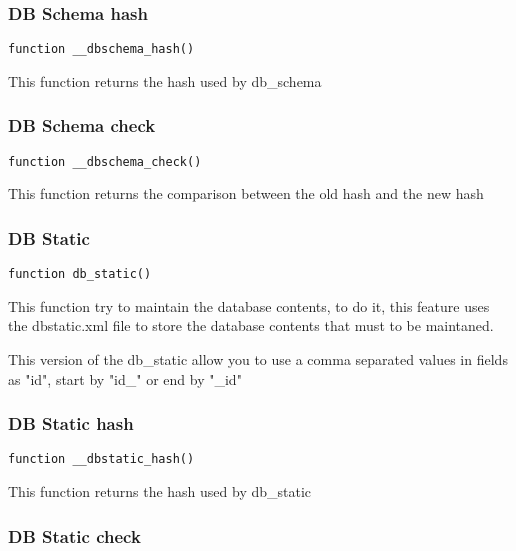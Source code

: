 \documentclass[a4paper]{article}
\begin{document}
\hypertarget{toc408}{}
\subsubsection{DB Schema hash}

\begin{lstlisting}
function __dbschema_hash()
\end{lstlisting}

This function returns the hash used by db\_schema

\hypertarget{toc409}{}
\subsubsection{DB Schema check}

\begin{lstlisting}
function __dbschema_check()
\end{lstlisting}

This function returns the comparison between the old hash and the new hash

\hypertarget{toc410}{}
\subsubsection{DB Static}

\begin{lstlisting}
function db_static()
\end{lstlisting}

This function try to maintain the database contents, to do it, this feature
uses the dbstatic.xml file to store the database contents that must to be
maintaned.

This version of the db\_static allow you to use a comma separated values in
fields as "id", start by "id\_" or end by "\_id"

\hypertarget{toc411}{}
\subsubsection{DB Static hash}

\begin{lstlisting}
function __dbstatic_hash()
\end{lstlisting}

This function returns the hash used by db\_static

\hypertarget{toc412}{}
\subsubsection{DB Static check}
\end{document}
